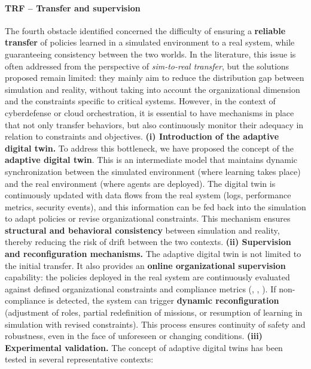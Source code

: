 \paragraph{TRF – Transfer and supervision}
The fourth obstacle identified concerned the difficulty of ensuring a \textbf{reliable transfer} of policies learned in a simulated environment to a real system, while guaranteeing consistency between the two worlds.
In the  literature, this issue is often addressed from the perspective of \textit{sim-to-real transfer}, but the solutions proposed remain limited:
they mainly aim to reduce the distribution gap between simulation and reality, without taking into account the organizational dimension and the constraints specific to critical systems.
However, in the context of cyberdefense or cloud orchestration, it is essential to have mechanisms in place that not only transfer behaviors, but also continuously monitor their adequacy in relation to constraints and objectives.
\medskip
\noindent
\textbf{(i) Introduction of the adaptive digital twin.}
To address this bottleneck, we have proposed the concept of the \textbf{adaptive digital twin}.
This is an intermediate model that maintains dynamic synchronization between the simulated environment (where learning takes place) and the real environment (where agents are deployed).
The digital twin is continuously updated with data flows from the real system (logs, performance metrics, security events), and this information can be fed back into the simulation to adapt policies or revise organizational constraints.
This mechanism ensures \textbf{structural and behavioral consistency} between simulation and reality, thereby reducing the risk of drift between the two contexts.
\medskip
\noindent
\textbf{(ii) Supervision and reconfiguration mechanisms.}
The adaptive digital twin is not limited to the initial transfer.
It also provides an \textbf{online organizational supervision} capability:
the policies deployed in the real system are continuously evaluated against defined organizational constraints and compliance metrics (, , ).
If non-compliance is detected, the system can trigger \textbf{dynamic reconfiguration} (adjustment of roles, partial redefinition of missions, or resumption of learning in simulation with revised constraints).
This process ensures continuity of safety and robustness, even in the face of unforeseen or changing conditions.
\medskip
\noindent
\textbf{(iii) Experimental validation.}
The concept of adaptive digital twins has been tested in several representative contexts:
